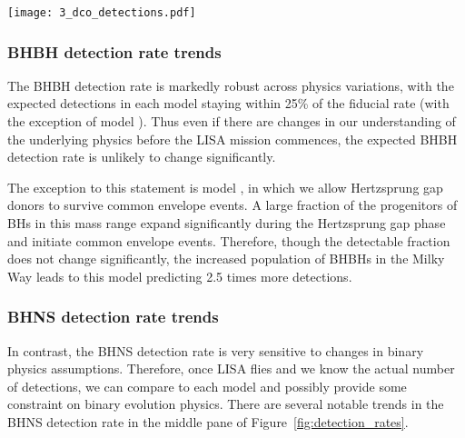 \begin{figure*}[p]
    \centering
    \texttt{[image: 3\_dco\_detections.pdf]}
    \caption{The number of expected detections in the LISA mission for different DCO types and model variations. Error bars show the 1- (solid) and 2-$\sigma$ (dotted) Poisson uncertainties. An arrow indicates that the error bar extends to zero. The left axis and grid lines show the number of detections in a 4-year LISA mission and the right axis shows an approximation of the number of detections in a 10-year mission (we scale the axis by $\sqrt{T_{\rm obs}}$, see Table~\ref{tab:detection_rates} for exact rates). Each model is described in further detail in Table~\ref{tab:physics_variations} and details of the fiducial assumptions are in Section~\ref{sec:fiducial_physics}. }
    \label{fig:detection_rates}
\end{figure*}

\subsubsection{BHBH detection rate trends}
The BHBH detection rate is markedly robust across physics variations, with the expected detections in each model staying within 25\% of the fiducial rate (with the exception of model \modOpt{}). Thus even if there are changes in our understanding of the underlying physics before the LISA mission commences, the expected BHBH detection rate is unlikely to change significantly.

The exception to this statement is model \modOpt{}, in which we allow Hertzsprung gap donors to survive common envelope events. A large fraction of the progenitors of BHs in this mass range expand significantly during the Hertzsprung gap phase and initiate common envelope events. Therefore, though the detectable fraction does not change significantly, the increased population of BHBHs in the Milky Way leads to this model predicting 2.5 times more detections.

\subsubsection{BHNS detection rate trends}
In contrast, the BHNS detection rate is very sensitive to changes in binary physics assumptions. Therefore, once LISA flies and we know the actual number of detections, we can compare to each model and possibly provide some constraint on binary evolution physics. There are several notable trends in the BHNS detection rate in the middle pane of Figure~\ref{fig:detection_rates}.

